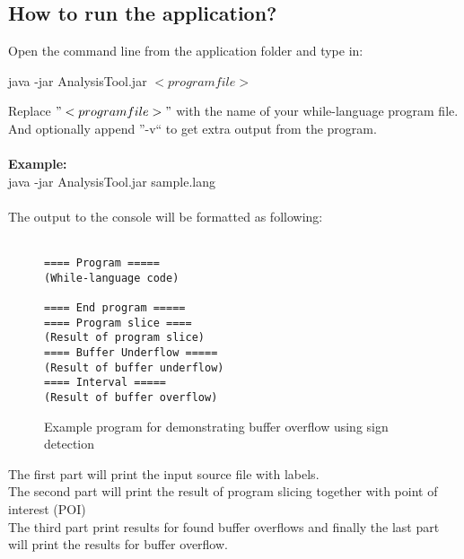 \begin{appendices}
\chapter{How to run the application?}
Open the command line from the application folder and type in:
\begin{description}
	\item java -jar AnalysisTool.jar $<programfile>$ 
\end{description}

Replace $"<programfile>"$ with the name of your while-language program file. And optionally append ''-v`` to get extra output from the program.
\\\\
\textbf{Example:}\\
java -jar AnalysisTool.jar sample.lang
\\\\
The output to the console will be formatted as following:
\\\\
\begin{figure}[H]
\begin{lstlisting}
==== Program =====
(While-language code)

==== End program =====
==== Program slice ====
(Result of program slice)
==== Buffer Underflow =====
(Result of buffer underflow)
==== Interval =====
(Result of buffer overflow)
 \end{lstlisting}
 \caption{Example program for demonstrating buffer overflow using sign detection}
 \label{code:array_example}
\end{figure}
\noindent The first part will print the input source file with labels.\\
The second part will print the result of program slicing together with point of interest (POI)\\
The third part print results for found buffer overflows and finally the last part will print the results for buffer overflow.


\end{appendices}
